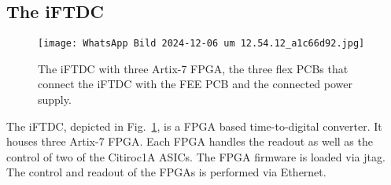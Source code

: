 \subsection{The iFTDC}\label{sec:iFTDC}
\begin{figure}[H]
    \centering
    \texttt{[image: WhatsApp Bild 2024-12-06 um 12.54.12\_a1c66d92.jpg]}
    \caption{The iFTDC with three Artix-7 FPGA, the three flex PCBs that connect the iFTDC with the FEE PCB and the connected power supply.}
    \label{fig:iFTDC}
\end{figure}

The iFTDC, depicted in Fig.~\ref{fig:iFTDC}, is a FPGA based time-to-digital converter. It houses three Artix-7 FPGA.
Each FPGA handles the readout as well as the control  of two of the Citiroc1A ASICs\autocite{InternalcommunicationIgor}.
\newline
The FPGA firmware is loaded via jtag. The control and readout of the FPGAs is performed via Ethernet.









 

